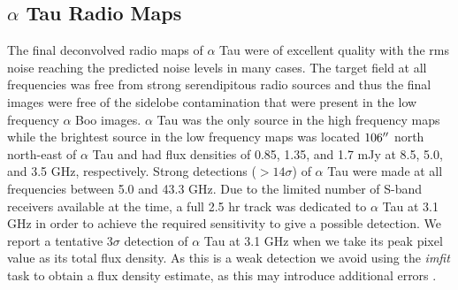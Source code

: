 \documentclass[iop]{emulateapj}
\begin{document}
\subsection{$\alpha$ Tau Radio Maps} \label{results2}
The final deconvolved radio maps of $\alpha$ Tau were of excellent quality with the rms noise reaching the predicted noise levels in many cases. The target field at all frequencies was free from strong serendipitous radio sources and thus the final images were free of the sidelobe contamination that were present in the low frequency $\alpha$ Boo images. $\alpha$ Tau was the only source in the high frequency maps while the brightest source in the low frequency maps was located $106\mbox{$^{\prime\prime}$}$ north north-east of $\alpha$ Tau and had flux densities of 0.85, 1.35, and 1.7 mJy at 8.5, 5.0, and 3.5 GHz, respectively. Strong detections ($>14\sigma$) of $\alpha$ Tau were made at all frequencies between 5.0 and 43.3 GHz. Due to the limited number of S-band receivers available at the time, a full 2.5 hr track was dedicated to $\alpha$ Tau at 3.1 GHz in order to achieve the required sensitivity to give a possible detection. We report a tentative $3\sigma$ detection of $\alpha$ Tau at 3.1 GHz when we take its peak pixel value as its total flux density. As this is a weak detection we avoid using the \textit{imfit} task to obtain a flux density estimate, as this may introduce additional errors \citep{1999ASPC..180.....T}.
\end{document}
